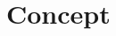 \chapter{Concept}
\label{chap:concept}

\begin{comment}
Main loop:
1. Fetch current control value and feedback from system
2. Calculate new output value accordingly
3. Adjust output (PWM?)

Bare-metal vs
Preempt-RT vs
linux
\end{comment}